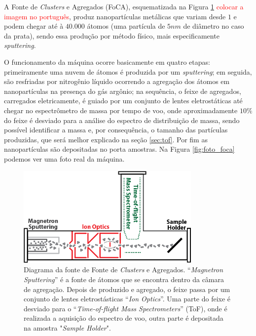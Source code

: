 

A Fonte de \textit{Clusters} e Agregados (FoCA), esquematizada na Figura \ref{fig:esquema_foca} \textcolor{red}{colocar a imagem no português}, produz nanopartículas metálicas que variam desde $1$ e podem chegar até à $40.000$ átomos (uma partícula de $5nm$ de diâmetro no caso da prata), sendo essa produção por método físico, mais especificamente \textit{sputtering}.

O funcionamento da máquina ocorre basicamente em quatro etapas: primeiramente uma nuvem de átomos é produzida por um \textit{sputtering}; em seguida, são resfriadas por nitrogênio líquido ocorrendo a agregação dos átomos em nanopartículas na presença do gás argônio; na sequência, o feixe de agregados, carregados eletricamente, é guiado por um conjunto de lentes eletrostáticas até chegar no espectrômetro de massa por tempo de voo, onde aproximadamente $10\%$ do feixe é desviado para a análise do espectro de distribuição de massa, sendo possível identificar a massa e, por consequência, o tamanho das partículas produzidas, que será melhor explicado na seção \ref{sec:tof}. Por fim as nanopartículas são depositadas no porta amostras. Na Figura \ref{fig:foto_foca} podemos ver uma foto real da máquina. 

\begin{figure}
  \centering
  \includegraphics[width=0.8\textwidth]{images/foca/esquematico_foca}
  \caption{ Diagrama da fonte de Fonte de \textit{Clusters} e Agregados. ``\textit{Magnetron Sputtering}'' é a fonte de átomos que se encontra dentro da câmara de agregação. Depois de produzido e agregado, o feixe passa por um conjunto de lentes eletrostásticas  ``\textit{Ion Optics}''. Uma parte do feixe é desviado para o ``\textit{Time-of-flight Mass Spectrometers}'' (ToF), onde é realizada a aquisição do espectro de voo, outra parte é depositada na amostra "\textit{Sample Holder}"\cite{livro_vitor}.  }
  \label{fig:esquema_foca}
\end{figure}

